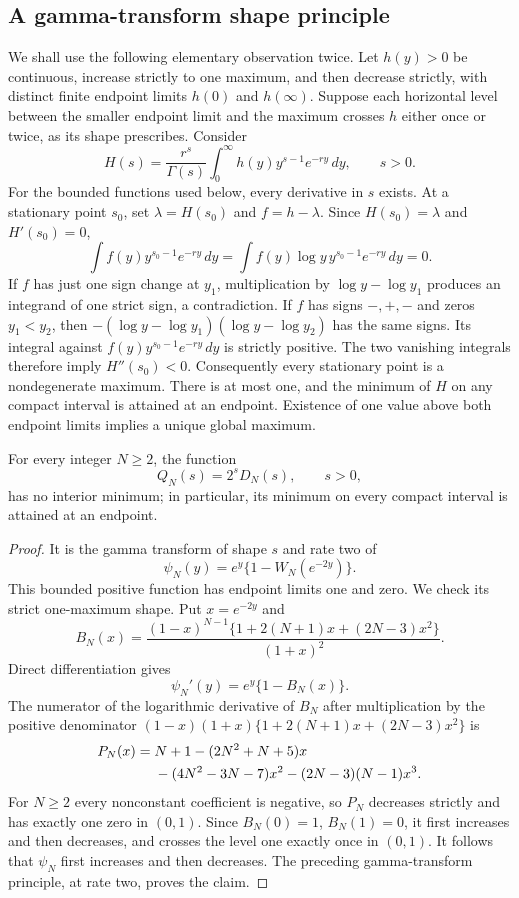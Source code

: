 \subsection{A gamma-transform shape principle}

We shall use the following elementary observation twice.  Let
$h(y)>0$ be continuous, increase strictly to one maximum, and then
decrease strictly, with distinct finite endpoint limits $h(0)$ and
$h(\infty)$.  Suppose each horizontal level between the smaller
endpoint limit and the maximum crosses $h$ either once or twice,
as its shape prescribes.  Consider
\[
 H(s)=\frac{r^s}{\Gamma(s)}\int_0^\infty
                  h(y)y^{s-1}e^{-ry}\,dy,\qquad s>0.
\]
For the bounded functions used below, every derivative in $s$ exists.
At a stationary point $s_0$, set $\lambda=H(s_0)$ and
$f=h-\lambda$.  Since $H(s_0)=\lambda$ and $H'(s_0)=0$,
\[
 \int f(y)y^{s_0-1}e^{-ry}\,dy
 =\int f(y)\log y\,y^{s_0-1}e^{-ry}\,dy=0.
\]
If $f$ has just one sign change at $y_1$, multiplication by
$\log y-\log y_1$ produces an integrand of one strict sign,
a contradiction.  If $f$ has signs $-,+,-$ and zeros $y_1<y_2$,
then $-(\log y-\log y_1)(\log y-\log y_2)$ has the same signs.
Its integral against $f(y)y^{s_0-1}e^{-ry}\,dy$ is strictly positive.
The two vanishing integrals therefore imply $H''(s_0)<0$.
Consequently every stationary point is a nondegenerate maximum.
There is at most one, and the minimum of $H$ on any compact interval
is attained at an endpoint.  Existence of one value above both
endpoint limits implies a unique global maximum.

\begin{lemma}\label{lateaxis:lem:defect}
For every integer $N\ge2$, the function
\[
 Q_N(s)=2^sD_N(s),\qquad s>0,
\]
has no interior minimum; in particular, its minimum on every compact
interval is attained at an endpoint.
\end{lemma}
\begin{proof}
It is the gamma transform of shape $s$ and rate two of
\[
 \psi_N(y)=e^y\{1-W_N(e^{-2y})\}.
\]
This bounded positive function has endpoint limits one and zero.
We check its strict one-maximum shape.  Put $x=e^{-2y}$ and
\[
 B_N(x)=\frac{(1-x)^{N-1}
                 \{1+2(N+1)x+(2N-3)x^2\}}{(1+x)^2}.
\]
Direct differentiation gives
\[
 \psi_N'(y)=e^y\{1-B_N(x)\}.
\]
The numerator of the logarithmic derivative of $B_N$ after
multiplication by the positive denominator
$(1-x)(1+x)\{1+2(N+1)x+(2N-3)x^2\}$ is
\begin{align*}
 P_N(x)={}&N+1-(2N^2+N+5)x\notag\\
          &-(4N^2-3N-7)x^2-(2N-3)(N-1)x^3.
\end{align*}
For $N\ge2$ every nonconstant coefficient is negative, so $P_N$
decreases strictly and has exactly one zero in $(0,1)$.
Since $B_N(0)=1$, $B_N(1)=0$, it first increases and then decreases,
and crosses the level one exactly once in $(0,1)$.  It follows that
$\psi_N$ first increases and then decreases.  The preceding
gamma-transform principle, at rate two, proves the claim.
\end{proof}

